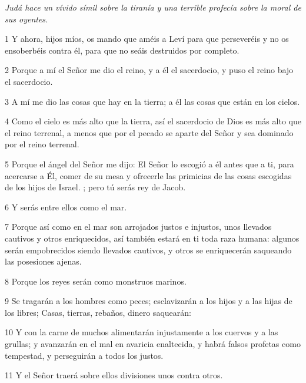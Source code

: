 \par \textit{Judá hace un vívido símil sobre la tiranía y una terrible profecía sobre la moral de sus oyentes.}

\par 1 Y ahora, hijos míos, os mando que améis a Leví para que perseveréis y no os ensoberbéis contra él, para que no seáis destruidos por completo.

\par 2 Porque a mí el Señor me dio el reino, y a él el sacerdocio, y puso el reino bajo el sacerdocio.

\par 3 A mí me dio las cosas que hay en la tierra; a él las cosas que están en los cielos.

\par 4 Como el cielo es más alto que la tierra, así el sacerdocio de Dios es más alto que el reino terrenal, a menos que por el pecado se aparte del Señor y sea dominado por el reino terrenal.

\par 5 Porque el ángel del Señor me dijo: El Señor lo escogió a él antes que a ti, para acercarse a Él, comer de su mesa y ofrecerle las primicias de las cosas escogidas de los hijos de Israel. ; pero tú serás rey de Jacob.

\par 6 Y serás entre ellos como el mar.

\par 7 Porque así como en el mar son arrojados justos e injustos, unos llevados cautivos y otros enriquecidos, así también estará en ti toda raza humana: algunos serán empobrecidos siendo llevados cautivos, y otros se enriquecerán saqueando las posesiones ajenas.

\par 8 Porque los reyes serán como monstruos marinos.

\par 9 Se tragarán a los hombres como peces; esclavizarán a los hijos y a las hijas de los libres; Casas, tierras, rebaños, dinero saquearán:

\par 10 Y con la carne de muchos alimentarán injustamente a los cuervos y a las grullas; y avanzarán en el mal en avaricia enaltecida, y habrá falsos profetas como tempestad, y perseguirán a todos los justos.

\par 11 Y el Señor traerá sobre ellos divisiones unos contra otros.

